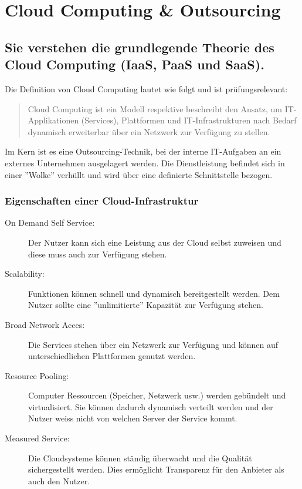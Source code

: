 \chapter{Cloud Computing \& Outsourcing}

\section{Sie verstehen die grundlegende Theorie des Cloud Computing (IaaS, PaaS und SaaS).}

Die Definition von Cloud Computing lautet wie folgt und ist prüfungsrelevant:
\begin{quote}
	Cloud Computing ist ein Modell respektive beschreibt den Ansatz, um IT-Applikationen (Services), Plattformen und IT-Infrastrukturen nach Bedarf dynamisch erweiterbar über ein Netzwerk zur Verfügung zu stellen.
\end{quote}
Im Kern ist es eine Outsourcing-Technik, bei der interne IT-Aufgaben an ein externes Unternehmen ausgelagert werden. Die Dienstleistung befindet sich in einer ''Wolke'' verhüllt und wird über eine definierte Schnittstelle bezogen.

\subsection{Eigenschaften einer Cloud-Infrastruktur}
\begin{description}
	\item[On Demand Self Service:] Der Nutzer kann sich eine Leistung aus der Cloud selbst zuweisen und diese muss auch zur Verfügung stehen.
	\item[Scalability:] Funktionen können schnell und dynamisch bereitgestellt werden. Dem Nutzer sollte eine ''unlimitierte'' Kapazität zur Verfügung stehen.
	\item[Broad Network Acces:] Die Services stehen über ein Netzwerk zur Verfügung und können auf unterschiedlichen Plattformen genutzt werden.
	\item[Resource Pooling:] Computer Ressourcen (Speicher, Netzwerk usw.) werden gebündelt und virtualisiert. Sie können dadurch dynamisch verteilt werden und der Nutzer weiss nicht von welchen Server der Service kommt.
	\item[Measured Service:] Die Cloudsysteme können ständig überwacht und die Qualität sichergestellt werden. Dies ermöglicht Transparenz für den Anbieter als auch den Nutzer.
\end{description}

